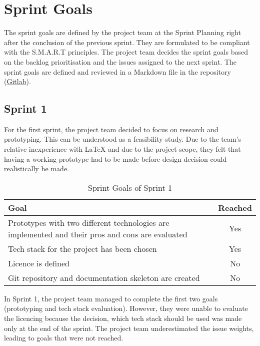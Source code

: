 \section{Sprint Goals}
The sprint goals are defined by the project team at the Sprint Planning right after the conclusion of the previous sprint.
They are formulated to be compliant with the S.M.A.R.T principles. The project team decides the sprint goals based on the backlog
prioritisation and the issues assigned to the next sprint. The sprint goals are defined and reviewed in a Markdown file in the repository (\href{https://gitlab.ti.bfh.ch/decibel-threshold-event-displayer/decibel-threshold-event-displayer/-/blob/main/doc/scrum/sprints.md}{Gitlab}).
\subsection{Sprint 1}
For the first sprint, the project team decided to focus on research and prototyping. This can be understood as a feasibility study.
Due to the team's relative inexperience with LaTeX and due to the project scope, they felt that having a working prototype had to be
made before design decision could realistically be made. \\
\begin{table}[H]
    \centering
    \begin{tabularx}{\textwidth}{X c}
        \toprule
        \textbf{Goal}                                                                                    & \textbf{Reached} \\
        \midrule
        Prototypes with two different technologies are implemented and their pros and cons are evaluated & Yes              \\
        \midrule
        Tech stack for the project has been chosen                                                       & Yes              \\
        \midrule
        Licence is defined                                                                               & No               \\
        \midrule
        Git repository and documentation skeleton are created                                            & No               \\
        \bottomrule
    \end{tabularx}
    \caption{Sprint Goals of Sprint 1}\label{table:sprint_goals1}
\end{table}
In Sprint 1, the project team managed to complete the first two goals (prototyping and tech stack evaluation). However, they were unable to
evaluate the licencing because the decision, which tech stack should be used was made only at the end of the sprint. The project team underestimated
the issue weights, leading to goals that were not reached.
